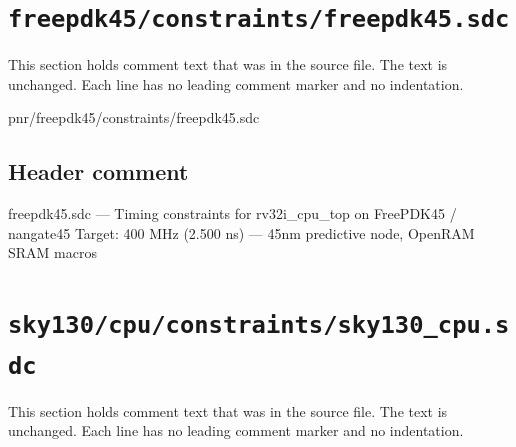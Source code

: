 \section{\texttt{freepdk45/constraints/freepdk45.sdc}}\label{tm:pd:freepdk45-sdc}

This section holds comment text that was in the source file. The text is unchanged. Each line has no leading comment marker and no indentation.

\begin{relocated}{pnr/freepdk45/constraints/freepdk45.sdc}

\subsection*{Header comment}

\begin{textblock}
freepdk45.sdc — Timing constraints for rv32i_cpu_top on FreePDK45 / nangate45
Target: 400 MHz (2.500 ns) — 45nm predictive node, OpenRAM SRAM macros
\end{textblock}

\end{relocated}

\section{\texttt{sky130/cpu/constraints/sky130\_cpu.sdc}}\label{tm:pd:sky130-cpu-sdc}

This section holds comment text that was in the source file. The text is unchanged. Each line has no leading comment marker and no indentation.

